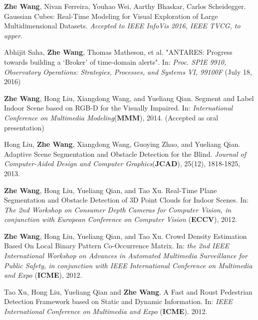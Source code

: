 \documentclass[10pt]{article}
\begin{document}
\begin{bibenum}
    \item \textbf{Zhe Wang}, Nivan Ferreira, Youhao Wei, Aarthy Bhaskar, Carlos Scheidegger. Gaussian Cubes: Real-Time Modeling for Visual Exploration of Large Multidimensional Datasets. 
        \emph{Accepted to IEEE InfoVis 2016, IEEE TVCG, to apper.}

    \item Abhijit Saha, \textbf{Zhe Wang}, Thomas Matheson, et al. "ANTARES: Progress towards building a ‘Broker’ of time-domain alerts". 
        In: \emph{Proc. SPIE 9910, Observatory Operations: Strategies, Processes, and Systems VI, 99100F} (July 18, 2016)

    \item \textbf{Zhe Wang}, Hong Liu, Xiangdong Wang, and Yueliang Qian. Segment and Label Indoor Scene based on RGB-D for the Visually Impaired.
        In: \emph{International Conference on Multimedia Modeling}(\textbf{MMM}), 2014.
        (Accepted as oral presentation)

    \item Hong Liu, \textbf{Zhe Wang}, Xiangdong Wang, Guoying Zhao, and Yueliang Qian. Adaptive Scene Segmentation and Obstacle Detection for the Blind.
        \emph{Journal of Computer-Aided Design and Computer Graphics}(\textbf{JCAD}), 25(12), 1818-1825, 2013.

    \item \textbf{Zhe Wang}, Hong Liu, Yueliang Qian, and Tao Xu. Real-Time Plane Segmentation and Obstacle Detection of 3D Point Clouds for Indoor Scenes.
        In: \emph{The 2nd Workshop on Consumer Depth Cameras for Computer Vision, in conjunction with European Conference on Computer Vision} (\textbf{ECCV}), 2012.

    \item \textbf{Zhe Wang}, Hong Liu, Yueliang Qian, and Tao Xu. Crowd Density Estimation Based On Local Binary Pattern Co-Occurrence Matrix.
        In: \emph{the 2nd IEEE International Workshop on Advances in Automated Multimedia Surveillance for Public Safety, in conjunction with IEEE International Conference on Multimedia and Expo }(\textbf{ICME}), 2012.

    \item Tao Xu, Hong Liu, Yueliang Qian and \textbf{Zhe Wang}. A Fast and Roust Pedestrian Detection Framework based on Static and Dynamic Information.
        In: \emph{IEEE International Conference on Multimedia and Expo} (\textbf{ICME}). 2012.
\end{bibenum}
\end{document}
